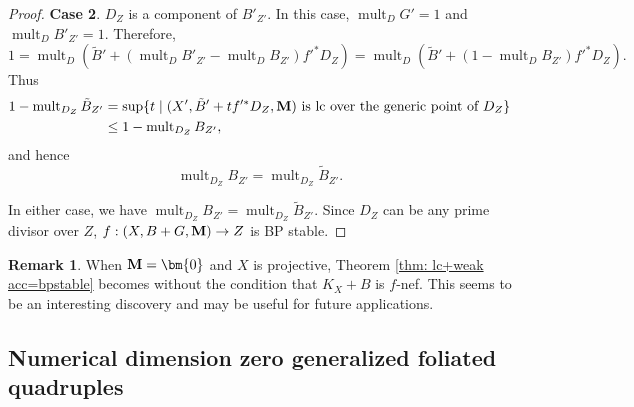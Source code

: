 \documentclass[11pt]{amsart}
\numberwithin{equation}{section}
\newcommand{\Mm}{{\bf{M}}}
\newcommand{\mult}{\operatorname{mult}}
\theoremstyle{definition}
\theoremstyle{definition}
\newtheorem{rem}[thm]{Remark}
\theoremstyle{definition}
\begin{document}
\begin{proof}
\medskip

\noindent\textbf{Case 2}. $D_Z$ is a component of $B'_{Z'}$. In this case, $\mult_DG'=1$ and $\mult_DB'_{Z'}=1$. Therefore,
$$1=\mult_D\left(\tilde B'+\left(\mult_DB'_{Z'}-\mult_DB_{Z'}\right)f'^*D_Z\right)=\mult_D\left(\tilde B'+\left(1-\mult_DB_{Z'}\right)f'^*D_Z\right).$$
Thus
\begin{align*}
1-\mult_{D_Z}\tilde B_{Z'}&=\sup\{t\mid (X',\tilde B'+tf'^*D_Z,\Mm)\text{ is lc over the generic point of }D_Z\}\\
&\leq 1-\mult_{D_Z}B_{Z'},
\end{align*}
and hence
$$\mult_{D_Z}B_{Z'}=\mult_{D_Z}\tilde B_{Z'}.$$

\medskip

In either case, we have $\mult_{D_Z}B_{Z'}=\mult_{D_Z}\tilde B_{Z'}$. Since $D_Z$ can be any prime divisor over $Z$, $f: (X,B+G,\Mm)\rightarrow Z$ is BP stable.
\end{proof}

\begin{rem}
When $\Mm=\bm{0}$ and $X$ is projective, Theorem \ref{thm: lc+weak acc=bpstable} becomes \cite[Theorem 4.3]{ACSS21} without the condition that $K_X+B$ is $f$-nef. This seems to be an interesting discovery and may be useful for future applications.
\end{rem}

\subsection{Numerical dimension zero generalized foliated quadruples}\label{sub: num 0 mmp}
\end{document}
